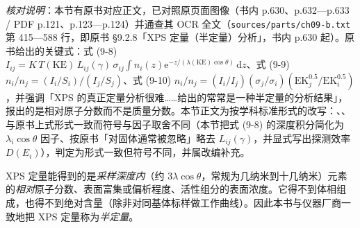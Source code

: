 \emph{核对说明}：本节有原书对应正文，已对照原页面图像（书内 p.630、p.632—p.633 / PDF p.121、p.123—p.124）并通查其 OCR 全文（\texttt{sources/parts/ch09-b.txt} 第 415—588 行，即原书 §9.2.8「XPS 定量（半定量）分析」，书内 p.630 起）。原书给出的关键式：式 (9-8) $I_{ij} = K\,T(\mathrm{KE})\,L_{ij}(\gamma)\,\sigma_{ij}\!\int n_i(z)\mathrm{e}^{-z/(\lambda(\mathrm{KE})\cos\theta)}\,\mathrm{d}z$、式 (9-9) $n_i/n_j = (I_i/S_i)/(I_j/S_j)$、式 (9-10) $n_i/n_j = (I_i/I_j)(\sigma_j/\sigma_i)(\mathrm{EK}_j^{0.5}/\mathrm{EK}_i^{0.5})$，并强调「XPS 的真正定量分析很难……给出的常常是一种半定量的分析结果」，报出的是相对原子分数而不是质量分数。本节正文为按学科标准形式的改写：、、 与原书上式形式一致而符号与因子取舍不同（本节把式 (9-8) 的深度积分简化为 $\lambda_i\cos\theta$ 因子、按原书「对固体通常被忽略」略去 $L_{ij}(\gamma)$，并显式写出探测效率 $D(E_i)$），判定为形式一致但符号不同，并属改编补充。

\begin{probout}
XPS 定量能得到的是\emph{采样深度内}（约 $3\lambda\cos\theta$，常规为几纳米到十几纳米）元素的\emph{相对}原子分数、表面富集或偏析程度、活性组分的表面浓度。它得不到体相组成，也得不到绝对含量（除非对同基体标样做工作曲线）。因此本书与仪器厂商一致地把 XPS 定量称为\emph{半定量}。
\end{probout}

